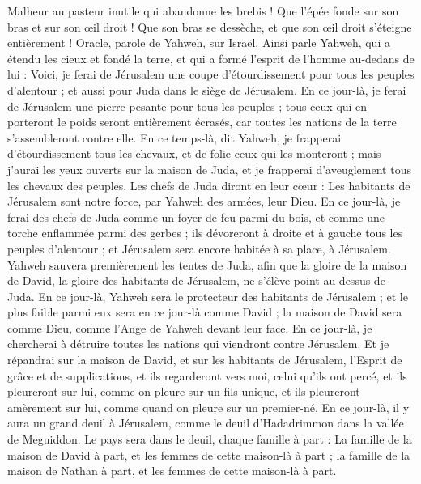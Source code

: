 \begin{multicols}{2}
Malheur au pasteur inutile qui abandonne les brebis ! Que l’épée fonde sur son bras et sur son œil droit ! Que son bras se dessèche, et que son œil droit s’éteigne entièrement !
\VerseOne{}Oracle, parole de Yahweh, sur Israël. Ainsi parle Yahweh, qui a étendu les cieux et fondé la terre, et qui a formé l'esprit de l'homme au-dedans de lui :
Voici, je ferai de Jérusalem une coupe d'étourdissement pour tous les peuples d'alentour ; et aussi pour Juda dans le siège de Jérusalem.
En ce jour-là, je ferai de Jérusalem une pierre pesante pour tous les peuples ; tous ceux qui en porteront le poids seront entièrement écrasés, car toutes les nations de la terre s'assembleront contre elle.
En ce temps-là, dit Yahweh, je frapperai d'étourdissement tous les chevaux, et de folie ceux qui les monteront ; mais j’aurai les yeux ouverts sur la maison de Juda, et je frapperai d'aveuglement tous les chevaux des peuples.
Les chefs de Juda diront en leur cœur : Les habitants de Jérusalem sont notre force, par Yahweh des armées, leur Dieu.
En ce jour-là, je ferai des chefs de Juda comme un foyer de feu parmi du bois, et comme une torche enflammée parmi des gerbes ; ils dévoreront à droite et à gauche tous les peuples d'alentour ; et Jérusalem sera encore habitée à sa place, à Jérusalem.
Yahweh sauvera premièrement les tentes de Juda, afin que la gloire de la maison de David, la gloire des habitants de Jérusalem, ne s'élève point au-dessus de Juda.
En ce jour-là, Yahweh sera le protecteur des habitants de Jérusalem ; et le plus faible parmi eux sera en ce jour-là comme David ; la maison de David sera comme Dieu, comme l'Ange de Yahweh devant leur face.
En ce jour-là, je chercherai à détruire toutes les nations qui viendront contre Jérusalem.
Et je répandrai sur la maison de David, et sur les habitants de Jérusalem, l'Esprit de grâce et de supplications, et ils regarderont vers moi, celui qu’ils ont percé, et ils pleureront sur lui, comme on pleure sur un fils unique, et ils pleureront amèrement sur lui, comme quand on pleure sur un premier-né.
En ce jour-là, il y aura un grand deuil à Jérusalem, comme le deuil d'Hadadrimmon dans la vallée de Meguiddon.
Le pays sera dans le deuil, chaque famille à part : La famille de la maison de David à part, et les femmes de cette maison-là à part ; la famille de la maison de Nathan à part, et les femmes de cette maison-là à part.

\end{multicols}
